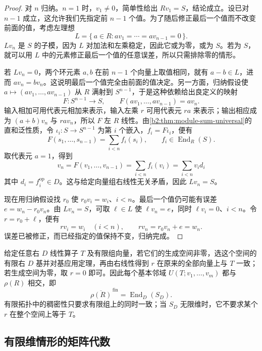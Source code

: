 \begin{proof}
	对 \(n\) 归纳。\(n=1\) 时，\(v_1\ne0\)，简单性给出 \(Rv_1=S\)，结论成立。设已对 \(n-1\) 成立，这允许我们先指定前 \(n-1\) 个值。为了随后修正最后一个值而不改变前面的值，考虑左理想
	\[
		L=\{\,a\in R:av_1=\cdots=av_{n-1}=0\,\}.
	\]
	\(Lv_n\) 是 \(S\) 的子模，因为 \(L\) 对加法和左乘稳定，因此它或为零，或为 \(S\)。若为 \(S\)，就可以用 \(L\) 中的元素修正最后一个值的任意误差，所以只需排除零的情形。

	若 \(Lv_n=0\)，两个环元素 \(a,b\) 在前 \(n-1\) 个向量上取值相同，就有 \(a-b\in L\)，进而 \(av_n=bv_n\)。这说明最后一个值完全由前面的值决定。另一方面，归纳假设使 \(a\mapsto(av_1,\ldots,av_{n-1})\) 从 \(R\) 满射到 \(S^{n-1}\)，于是这种依赖给出良定义的映射
	\[
		F:S^{n-1}\longrightarrow S, \qquad F(av_1,\ldots,av_{n-1})=av_n.
	\]
	输入相加可用代表元相加来表示，输入左乘 \(r\) 可用代表元 \(ra\) 来表示；输出相应成为 \((a+b)v_n\) 与 \(rav_n\)，所以 \(F\) 左 \(R\) 线性。由\cref{b2:thm:module-sum-universal}的直和泛性质，令 \(\iota_i:S\to S^{n-1}\) 为第 \(i\) 个嵌入，\(f_i=F\iota_i\)，便有
	\[
		F(s_1,\ldots,s_{n-1})=\sum_{i<n}f_i(s_i), \qquad f_i\in\operatorname{End}_R(S).
	\]
	取代表元 \(a=1\)，得到
	\[
		v_n=F(v_1,\ldots,v_{n-1})=\sum_{i<n}f_i(v_i)=\sum_{i<n}v_i d_i
	\]
	其中 \(d_i=f_i^{\mathrm{op}}\in D\)。这与给定向量组右线性无关矛盾，因此 \(Lv_n=S\)。

	现在用归纳假设找 \(r_0\) 使 \(r_0v_i=w_i\)、\(i<n\)。最后一个值仍可能有误差 \(e=w_n-r_0v_n\)。由 \(Lv_n=S\)，可取 \(\ell\in L\) 使 \(\ell v_n=e\)，同时 \(\ell v_i=0\)、\(i<n\)。令 \(r=r_0+\ell\)，便有
	\[
		rv_i=w_i\quad(i<n), \qquad rv_n=r_0v_n+e=w_n.
	\]
	误差已被修正，而已经指定的值保持不变，归纳完成。
\end{proof}

给定任意右 \(D\) 线性算子 \(T\) 及有限组向量，若它们的生成空间非零，选这个空间的有限右 \(D\) 基并对基应用定理，再由右线性得到 \(r\) 在原来的全部向量上与 \(T\) 一致；若生成空间为零，取 \(r=0\) 即可。因此每个基本邻域 \(U(T;v_1,\ldots,v_m)\) 都与 \(\rho(R)\) 相交，即
\[
	\overline{\rho(R)}^{\,\mathrm{fin}}=\operatorname{End}_D(S_D).
\]
有限拓扑中的稠密性只要求有限组上的同时一致；当 \(S_D\) 无限维时，它不要求某个 \(r\) 在整个空间上等于 \(T\)。

\subsection{有限维情形的矩阵代数}
\label{b2:subsec:1404:03}

